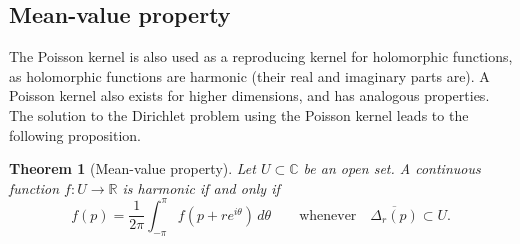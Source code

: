 \documentclass[12pt,openany]{book}
\newcommand{\C}{{\mathbb{C}}}
\newcommand{\R}{{\mathbb{R}}}
\theoremstyle{plain}
\newtheorem{thm}{Theorem}[section]
\theoremstyle{remark}
\theoremstyle{definition}
\theoremstyle{exercise}
\theoremstyle{example}
\begin{document}
\subsection{Mean-value property}

The Poisson kernel is also used as a reproducing kernel for
holomorphic functions, as holomorphic functions are harmonic (their real and
imaginary parts are).
A Poisson kernel also exists for higher dimensions, and has
analogous properties.
The solution to the Dirichlet problem using the Poisson kernel leads to
the following proposition.

\begin{thm}[Mean-value property]
\label{prop:meanprop}
Let $U \subset \C$ be an open set.
A continuous function
$f \colon U \to \R$
is harmonic if and only if 
\begin{equation*}
f(p) = \frac{1}{2\pi} \int_{-\pi}^{\pi} f(p+re^{i\theta})\, d\theta
\qquad \text{whenever} \quad
\overline{\Delta_r(p)} \subset U .
\end{equation*}
\end{thm}
\end{document}
